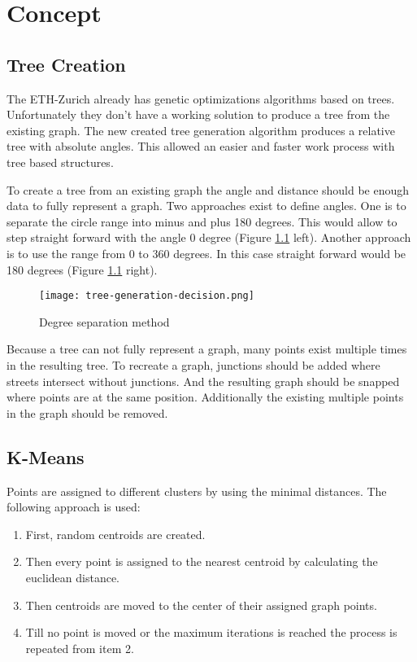 \chapter{Concept}
\section{Tree Creation}
The ETH-Zurich already has genetic optimizations algorithms based on trees. Unfortunately they don't have a working solution to produce a tree from the existing graph. The new created tree generation algorithm produces a relative tree with absolute angles. This allowed an easier and faster work process with tree based structures.

To create a tree from an existing graph the angle and distance should be enough data to fully represent a graph.
Two approaches exist to define angles. One is to separate the circle range into minus and plus 180 degrees. This would allow to step straight forward with the angle 0 degree (Figure \ref{fig:tree-generation-decision} left). Another approach is to use the range from 0 to 360 degrees. In this case straight forward would be 180 degrees (Figure \ref{fig:tree-generation-decision} right).

\begin{figure}[!ht]
    \centering
    \texttt{[image: tree-generation-decision.png]}
    \caption{Degree separation method \label{fig:tree-generation-decision}}
\end{figure}

Because a tree can not fully represent a graph, many points exist multiple times in the resulting tree. To recreate a graph, junctions should be added where streets intersect without junctions. And the resulting graph should be snapped where points are at the same position. Additionally the existing multiple points in the graph should be removed.

\FloatBarrier
\pagebreak
\section{K-Means}
Points are assigned to different clusters by using the minimal distances. The following approach is used:

\begin{enumerate}
    \item First, random centroids are created.
    \item Then every point is assigned to the nearest centroid by calculating the euclidean distance.
    \item Then centroids are moved to the center of their assigned graph points.
    \item Till no point is moved or the maximum iterations is reached the process is repeated from item 2.
\end{enumerate}

